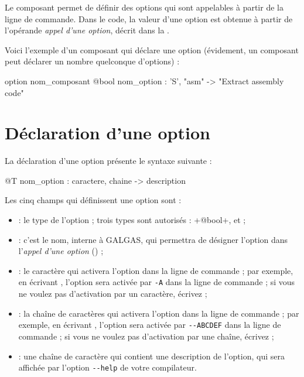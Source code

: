 


Le composant  permet de définir des options qui sont appelables à partir de la ligne de commande. Dans le code, la valeur d'une option est obtenue à partir de l'opérande \emph{appel d'une option}, décrit dans la .

Voici l'exemple d'un composant  qui déclare une option (évidement, un composant  peut déclarer un nombre quelconque d'options) :
\begin{galgascode}
option nom_composant {
  @bool nom_option : 'S', "asm" -> "Extract assembly code"
}
\end{galgascode}


\section{Déclaration d'une option}

La déclaration d'une option présente le syntaxe suivante :
\begin{galgascode}
  @T nom_option : caractere, chaine -> description
\end{galgascode}

Les cinq champs qui définissent une option sont :
\begin{itemize}
  \item {} : le type de l'option ; trois types sont autorisés : \ggs+@bool+,  et  ;
  \item {} : c'est le nom, interne à GALGAS, qui permettra de désigner l'option dans l'\emph{appel d'une option} () ; 
  \item {} : le caractère qui activera l'option dans la ligne de commande ; par exemple, en écrivant , l'option sera activée par \texttt{-A} dans la ligne de commande ; si vous ne voulez pas d'activation par un caractère, écrivez  ;
  \item {} : la chaîne de caractères qui activera l'option dans la ligne de commande ; par exemple, en écrivant , l'option sera activée par \texttt{-{}-ABCDEF} dans la ligne de commande ; si vous ne voulez pas d'activation par une chaîne, écrivez  ;
  \item {} : une chaîne de caractère qui contient une description de l'option, qui sera affichée par l'option \texttt{-{}-help} de votre compilateur.
\end{itemize}








